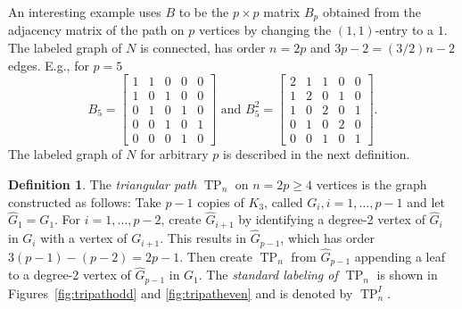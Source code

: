 \documentclass[12pt]{article}
\theoremstyle{definition}
\theoremstyle{definition}
\newtheorem{defn}[thm]{Definition}
\theoremstyle{definition}
\numberwithin{figure}{section}
\numberwithin{equation}{section}
\newcommand{\tp}{\operatorname{TP}}
\newcommand{\mtx}[1]{\begin{bmatrix} #1 \end{bmatrix}}
\begin{document}
An interesting example uses $B$ to be the $p\times p$ matrix  $B_p$ obtained from the adjacency matrix of the path on 
$p$ vertices by changing the $(1,1)$-entry to  a $1$.  The labeled graph of $N$ 
is connected, has {order}  $n=2p$  and $3p-2=(3/2)n-2$ edges.  
E.g., for $p=5$
\[ 
B_{5}= 
\mtx{
1 & 1 & 0 & 0 & 0\\ 
1& 0 & 1 & 0 &0 \\
        0 & 1 & 0 & 1 & 0 \\ 0 & 0 & 1 & 0 & 1\\
        0 & 0 & 0 & 1 & 0}\mbox{ and }
B_{5}^2=
\mtx{
2 & 1 & 1 & 0 & 0\\ 
1& 2 & 0 & 1 &0 \\
1 & 0 & 2 & 0 & 1 \\ 
     0 & 1 & 0 & 2 & 0\\
        0 & 0 & 1 & 0 & 1}.
\]
The labeled graph of $N$ for arbitrary $p$ is described in the  {next definition}. 
\begin{defn}\label{d:TPn}
The \emph{triangular path} $\tp_n$ on $n=2p\ge 4$ vertices is the  graph constructed as follows: Take $p-1$ copies of $K_3$, called $G_i,i=1,\dots,p-1$ and let $\hat G_1=G_1$.
For $i=1,\dots,p-2$, create $\hat G_{i+1}$ by identifying a degree-2 vertex of $\hat G_i$ in  $G_i$   with a vertex of $G_{i+1}$. This results in $\hat G_{p-1}$, which has order $3(p-1)-(p-2)=2p-1$.  Then create $\tp_n$ from $\hat G_{p-1}$ appending a leaf to a degree-2 vertex of $\hat G_{p-1}$ in  $G_1$.  The \emph{standard labeling of $\tp_n$} is shown in   Figures~\ref{fig:tripathodd} and \ref{fig:tripatheven}  and is denoted by $\tp_n^I$.
\end{defn}
\end{document}
